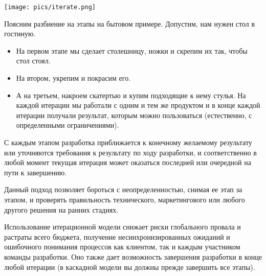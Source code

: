 \texttt{[image: pics/iterate.png]}

Поясним разбиение на этапы на бытовом примере. Допустим, нам нужен стол в гостиную.

\begin{itemize}
\item На первом этапе мы сделает столешницу, ножки и скрепим их так, чтобы стол стоял.
\item На втором, укрепим и покрасим его.
\item А на третьем, накроем скатертью и купим подходящие к нему стулья.
На каждой итерации мы работали с одним и тем же продуктом и в конце каждой итерации получали результат, которым можно пользоваться (естественно, с определенными ограничениями).
\end{itemize}
С каждым этапом разработка приближается к конечному желаемому результату или уточняются требования к результату по ходу разработки, и соответственно в любой момент текущая итерация может оказаться последней или очередной на пути к завершению.

Данный подход позволяет бороться с неопределенностью, снимая ее этап за этапом, и проверять правильность технического, маркетингового или любого другого решения на ранних стадиях. 

Использование итерационной модели снижает риски глобального провала и растраты всего бюджета, получение несинхронизированных ожиданий и ошибочного понимания процессов как клиентом, так и каждым участником команды разработки. Оно также дает возможность завершения разработки в конце любой итерации (в каскадной модели вы должны прежде завершить все этапы).

